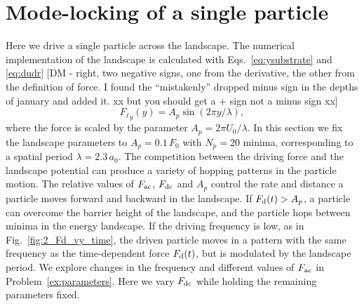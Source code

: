 \documentclass[preprint,showpacs,preprintnumbers,amsmath,amssymb,aps,prb]{revtex4-1}
\theoremstyle{remark}
\begin{document}
\section{Mode-locking of a single particle}
\label{sec:results}
Here we drive 
a single particle 
across the landscape. 
The numerical implementation of the landscape 
is calculated with Eqs.~\eqref{eq:ysubstrate} and \eqref{eq:dudr}  [DM - right, two negative signs, one from the derivative, the other from the definition of force.  I found the ``mistakenly'' dropped minus sign in the depths of january and added it.  xx but you should get a + sign not a minus sign xx] 
\begin{equation}
  \label{eq:force}
  {F_{\ell}}_y(y) = A_{p} \sin{(2 \pi y / \lambda)},
\end{equation}
where the force is scaled by the parameter $A_{p} = 2\pi U_0/\lambda$.
In this section we fix the landscape parameters
to $A_{p} = 0.1\,F_0$ 
with $N_p=20$ minima, 
corresponding to a spatial period $\lambda = 2.3\,a_0$.
The competition between the driving force and the landscape potential
can produce a variety of hopping patterns in the particle motion. 
The relative values of $F_{\rm ac}$, $F_{\rm dc}$ and $A_p$
control the rate and distance a  particle moves 
forward and backward in the landscape.
If $F_{\rm d}(t) > A_p$, a particle can 
overcome the barrier height of the landscape,
and 
the particle hops between minima in the energy landscape.
If the driving frequency is low,
as in Fig.~\ref{fig:2_Fd_vy_time},  
the driven particle 
moves 
in a pattern 
with the same frequency 
as the time-dependent force $F_{\rm d}(t)$,
but is modulated by the landscape period.
We explore changes in the frequency and different values of $F_{\rm ac}$ 
in Problem~\ref{ex:parameters}.
Here we vary $F_{\rm dc}$ 
while holding the remaining parameters fixed.
\end{document}
